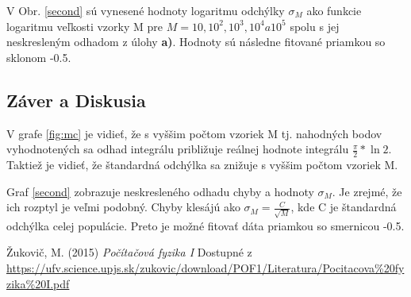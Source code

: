 \documentclass{article}
\theoremstyle{definition}
\theoremstyle{remark}
\begin{document}
V Obr. \ref{second} sú vynesené hodnoty logaritmu odchýlky $\sigma_M$ ako funkcie logaritmu veľkosti vzorky M pre $M = 10, 10^2, 10^3, 10^4 a 10^5$ spolu s jej neskresleným odhadom z úlohy \textbf{a)}. Hodnoty sú následne fitované priamkou so sklonom -0.5.

\subsection{Záver a Diskusia}
V grafe \ref{fig:mc} je vidieť, že s vyššim počtom vzoriek M tj. nahodných bodov vyhodnotených sa odhad integrálu približuje reálnej hodnote integrálu $\frac{\pi}{2} * \ln{2}$. Taktiež je vidieť, že štandardná odchýlka sa znižuje s vyššim počtom vzoriek M.   



Graf \ref{second} zobrazuje neskresleného odhadu chyby a hodnoty $\sigma_M$. Je zrejmé, že ich rozptyl je veľmi podobný. Chyby klesájú ako $\sigma_M=\frac{C}{\sqrt{M}}$, kde C je štandardná odchýlka celej populácie. Preto je možné fitovať dáta priamkou so smernicou -0.5.


\begin{thebibliography}{99}

Žukovič, M. (2015) \emph{Počítačová fyzika I} Dostupné z \url{https://ufv.science.upjs.sk/zukovic/download/POF1/Literatura/Pocitacova%20fyzika%20I.pdf}
\end{thebibliography}
\end{document}
